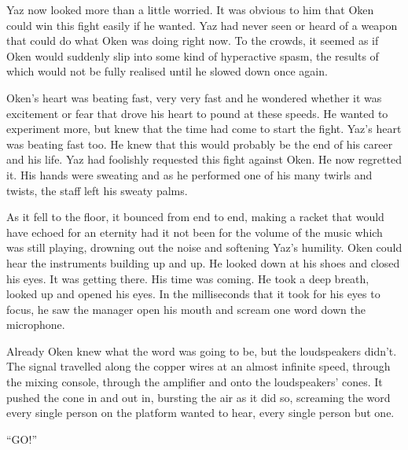 Yaz now looked more than a little worried. It was obvious to him that Oken could win this fight easily if he wanted. Yaz had never seen or heard of a weapon that could do what Oken was doing right now. To the crowds, it seemed as if Oken would suddenly slip into some kind of hyperactive spasm, the results of which would not be fully realised until he slowed down once again.

Oken's heart was beating fast, very very fast and he wondered whether it was excitement or fear that drove his heart to pound at these speeds. He wanted to experiment more, but knew that the time had come to start the fight. Yaz's heart was beating fast too. He knew that this would probably be the end of his career and his life. Yaz had foolishly requested this fight against Oken. He now regretted it. His hands were sweating and as he performed one of his many twirls and twists, the staff left his sweaty palms.

As it fell to the floor, it bounced from end to end, making a racket that would have echoed for an eternity had it not been for the volume of the music which was still playing, drowning out the noise and softening Yaz's humility. Oken could hear the instruments building up and up. He looked down at his shoes and closed his eyes. It was getting there. His time was coming. He took a deep breath, looked up and opened his eyes. In the milliseconds that it took for his eyes to focus, he saw the manager open his mouth and scream one word down the microphone.

Already Oken knew what the word was going to be, but the loudspeakers didn't. The signal travelled along the copper wires at an almost infinite speed, through the mixing console, through the amplifier and onto the loudspeakers' cones. It pushed the cone in and out in, bursting the air as it did so, screaming the word every single person on the platform wanted to hear, every single person but one.

``GO!''



